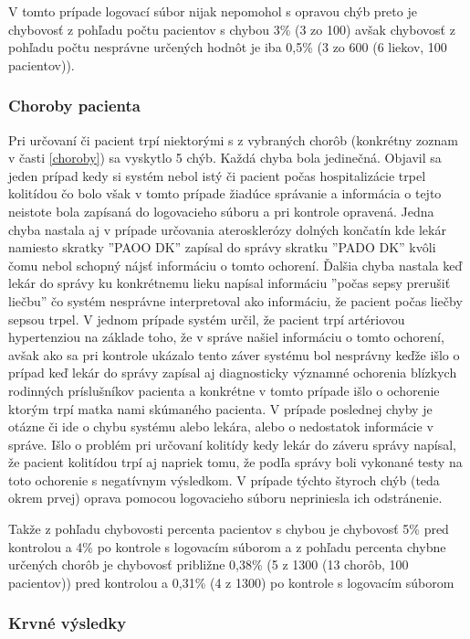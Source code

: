 V tomto prípade logovací súbor nijak nepomohol s opravou chýb preto je chybovosť z pohľadu počtu pacientov s chybou 3\% (3 zo 100) avšak chybovosť z pohľadu počtu nesprávne určených hodnôt je iba 0,5\% (3 zo 600 (6 liekov, 100 pacientov)).

\subsubsection{Choroby pacienta}

Pri určovaní či pacient trpí niektorými s z vybraných chorôb (konkrétny zoznam v časti \ref{choroby}) sa vyskytlo 5 chýb. Každá chyba bola jedinečná. Objavil sa jeden prípad kedy si systém nebol istý či pacient počas hospitalizácie trpel kolitídou čo bolo však v tomto prípade žiadúce správanie a informácia o tejto neistote bola zapísaná do logovacieho súboru a pri kontrole opravená. Jedna chyba nastala aj v prípade určovania aterosklerózy dolných končatín kde lekár namiesto skratky ''PAOO DK'' zapísal do správy skratku  ''PADO DK'' kvôli čomu nebol schopný nájsť informáciu o tomto ochorení. Ďalšia chyba nastala keď lekár do správy ku konkrétnemu lieku napísal informáciu ''počas sepsy prerušiť liečbu'' čo systém nesprávne interpretoval ako informáciu, že pacient počas liečby sepsou trpel. V jednom prípade systém určil, že pacient trpí artériovou hypertenziou na základe toho, že v správe našiel informáciu o tomto ochorení, avšak ako sa pri kontrole ukázalo tento záver systému bol nesprávny keďže išlo o prípad keď lekár do správy zapísal aj diagnosticky významné ochorenia blízkych rodinných príslušníkov pacienta a konkrétne v tomto prípade išlo o ochorenie ktorým trpí matka nami skúmaného pacienta. V prípade poslednej chyby je otázne či ide o chybu systému alebo lekára, alebo o nedostatok informácie v správe. Išlo o problém pri určovaní kolitídy kedy lekár do záveru správy napísal, že pacient kolitídou trpí aj napriek tomu, že podľa správy boli vykonané testy na toto ochorenie s negatívnym výsledkom. V prípade týchto štyroch chýb (teda okrem prvej) oprava pomocou logovacieho súboru nepriniesla ich odstránenie.

Takže z pohľadu chybovosti percenta pacientov s chybou je chybovosť 5\% pred kontrolou a 4\% po kontrole s logovacím súborom a z pohľadu percenta chybne určených chorôb je chybovosť približne 0,38\% (5 z 1300 (13 chorôb, 100 pacientov)) pred kontrolou a 0,31\% (4 z 1300) po kontrole s logovacím súborom

\subsubsection{Krvné výsledky}

